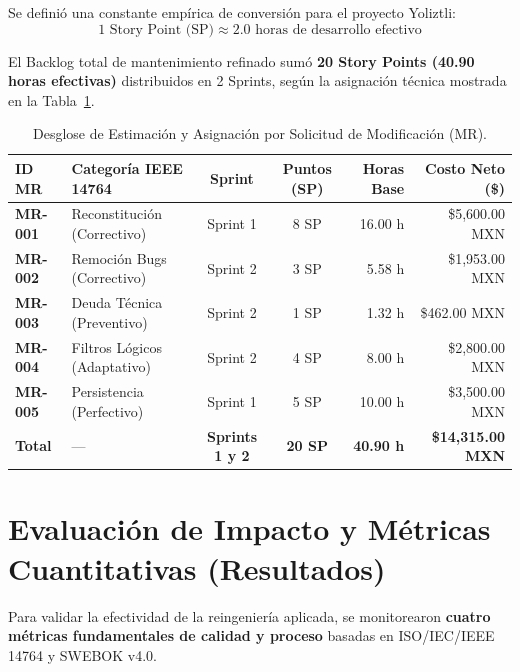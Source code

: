 \documentclass[12pt]{article}
\begin{document}
Se definió una constante empírica de conversión para el proyecto Yoliztli:
\begin{equation}
    1\text{ Story Point (SP)} \approx 2.0\text{ horas de desarrollo efectivo}
\end{equation}

El Backlog total de mantenimiento refinado sumó \textbf{20 Story Points (40.90 horas efectivas)} distribuidos en 2 Sprints, según la asignación técnica mostrada en la Tabla~\ref{tab:mr_estimation}.

\begin{table}[H]
    \centering
    \caption{Desglose de Estimación y Asignación por Solicitud de Modificación (MR).}
    \label{tab:mr_estimation}
    \small
    \color{black}
    \begin{tabularx}{\textwidth}{llccrr}
        \toprule
        \textbf{ID MR} & \textbf{Categoría IEEE 14764} & \textbf{Sprint} & \textbf{Puntos (SP)} & \textbf{Horas Base} & \textbf{Costo Neto (\$)} \\
        \midrule
        \textbf{MR-001} & Reconstitución (Correctivo) & Sprint 1 & 8 SP & 16.00 h & \$5,600.00 MXN \\
        \rowcolor{darkcard}
        \textbf{MR-002} & Remoción Bugs (Correctivo)  & Sprint 2 & 3 SP & 5.58 h  & \$1,953.00 MXN \\
        \textbf{MR-003} & Deuda Técnica (Preventivo)  & Sprint 2 & 1 SP & 1.32 h  & \$462.00 MXN \\
        \rowcolor{darkcard}
        \textbf{MR-004} & Filtros Lógicos (Adaptativo) & Sprint 2 & 4 SP & 8.00 h  & \$2,800.00 MXN \\
        \textbf{MR-005} & Persistencia (Perfectivo)   & Sprint 1 & 5 SP & 10.00 h & \$3,500.00 MXN \\
        \midrule
        \textbf{Total} & --- & \textbf{Sprints 1 y 2} & \textbf{20 SP} & \textbf{40.90 h} & \textbf{\$14,315.00 MXN} \\
        \bottomrule
    \end{tabularx}
\end{table}

\section{Evaluación de Impacto y Métricas Cuantitativas (Resultados)}

Para validar la efectividad de la reingeniería aplicada, se monitorearon \textbf{cuatro métricas fundamentales de calidad y proceso} basadas en ISO/IEC/IEEE 14764 y SWEBOK v4.0.
\end{document}
